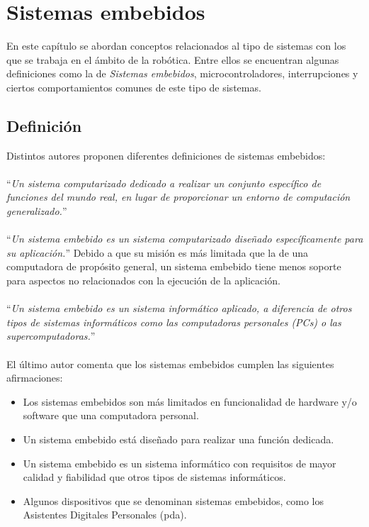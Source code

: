 \chapter{Sistemas embebidos}
\label{conceptos}

En este capítulo se abordan conceptos relacionados al tipo de sistemas con los que se trabaja en el ámbito de la robótica. Entre ellos se encuentran algunas definiciones como la de \textit{Sistemas embebidos}, microcontroladores, interrupciones y ciertos comportamientos comunes de este tipo de sistemas.


\section{Definición}
Distintos autores proponen diferentes definiciones de sistemas embebidos:
\\\\
\noindent
``\textit{Un sistema computarizado dedicado a realizar un conjunto específico de funciones del mundo real, en lugar de proporcionar un entorno de computación generalizado.}''~\cite{douglass}
\\\\
\noindent
``\textit{Un sistema embebido es un sistema computarizado diseñado específicamente para su aplicación.}'' Debido a que su misión es más limitada que la de una computadora de propósito general, un sistema embebido tiene menos soporte para aspectos no relacionados con la ejecución de la aplicación.~\cite{elecia}
\\\\
\noindent
``\textit{Un sistema embebido es un sistema informático aplicado, a diferencia de otros tipos de sistemas informáticos como las computadoras personales (PCs) o las supercomputadoras.}''~\cite{noergaard2005embedded}
\\\\
\noindent		
El último autor comenta que los sistemas embebidos cumplen las siguientes afirmaciones:
\begin{itemize}
	\item Los sistemas embebidos son más limitados en funcionalidad de hardware y/o software que una computadora personal.
	\item Un sistema embebido está diseñado para realizar una función dedicada.
	\item Un sistema embebido es un sistema informático con requisitos de mayor calidad y fiabilidad que otros tipos de sistemas informáticos.
	\item Algunos dispositivos que se denominan sistemas embebidos, como los Asistentes Digitales Personales (\gls{pda}).
\end{itemize}


